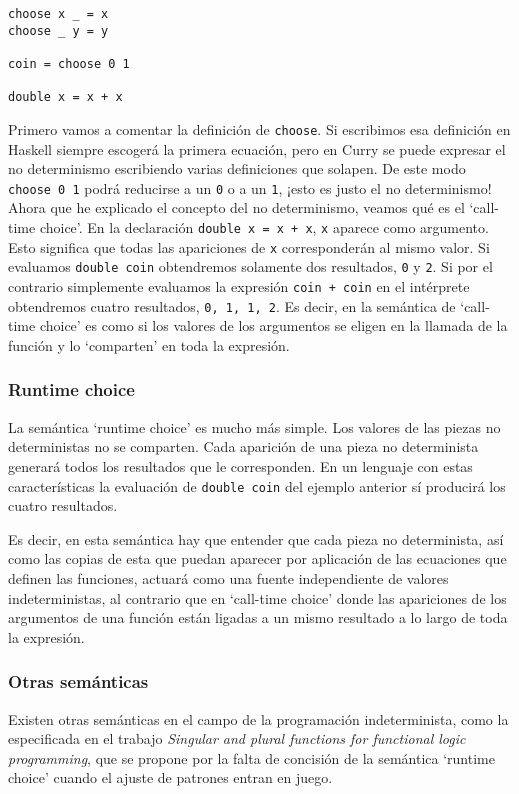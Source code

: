 \documentclass[class=article, crop=false]{standalone}
\begin{document}
\begin{verbatim}
choose x _ = x
choose _ y = y

coin = choose 0 1

double x = x + x
\end{verbatim}

Primero vamos a comentar la definición de \verb`choose`. Si escribimos esa definición en
Haskell siempre escogerá la primera ecuación, pero en Curry se puede expresar el no
determinismo escribiendo varias definiciones que solapen. De este modo \verb`choose 0 1`
podrá reducirse a un \verb`0` o a un \verb`1`, ¡esto es justo el no determinismo! Ahora que
he explicado el concepto del no determinismo, veamos qué es el `call-time choice'. En la
declaración \verb`double x = x + x`, \verb`x` aparece como argumento. Esto significa que
todas las apariciones de \verb`x` corresponderán al mismo valor. Si evaluamos
\verb`double coin` obtendremos solamente dos resultados, \verb`0` y \verb`2`. Si por el
contrario simplemente evaluamos la expresión \verb`coin + coin` en el intérprete obtendremos
cuatro resultados, \verb`0, 1, 1, 2`. Es decir, en la semántica de `call-time choice' es como
si los valores de los argumentos se eligen en la llamada de la función y lo `comparten' en
toda la expresión.

\subsubsection{Runtime choice}
La semántica `runtime choice' es mucho más simple. Los valores de las piezas no
deterministas no se comparten. Cada aparición de una pieza no determinista generará todos los
resultados que le corresponden. En un lenguaje con estas características la evaluación de
\verb`double coin` del ejemplo anterior sí producirá los cuatro resultados.

Es decir, en esta semántica hay que entender que cada pieza no determinista, así como las
copias de esta que puedan aparecer por aplicación de las ecuaciones que definen las
funciones, actuará como una fuente independiente de valores indeterministas, al contrario que
en `call-time choice' donde las apariciones de los argumentos de una función están ligadas a
un mismo resultado a lo largo de toda la expresión.

\subsubsection{Otras semánticas}
Existen otras semánticas en el campo de la programación indeterminista, como la especificada
en el trabajo \textit{Singular and plural functions for functional logic programming}\cite{
riesco2014singular}, que se propone por la falta de concisión de la semántica `runtime
choice' cuando el ajuste de patrones entran en juego.
\end{document}
